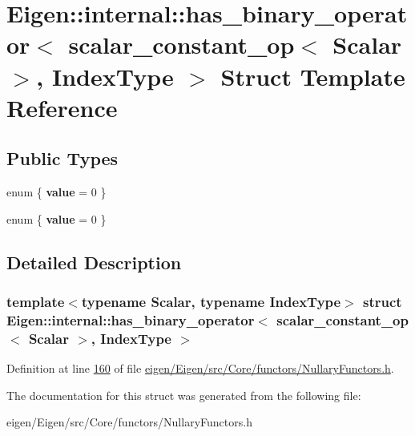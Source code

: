 \hypertarget{struct_eigen_1_1internal_1_1has__binary__operator_3_01scalar__constant__op_3_01_scalar_01_4_00_01_index_type_01_4}{}\section{Eigen\+:\+:internal\+:\+:has\+\_\+binary\+\_\+operator$<$ scalar\+\_\+constant\+\_\+op$<$ Scalar $>$, Index\+Type $>$ Struct Template Reference}
\label{struct_eigen_1_1internal_1_1has__binary__operator_3_01scalar__constant__op_3_01_scalar_01_4_00_01_index_type_01_4}
\subsection*{Public Types}
\begin{DoxyCompactItemize}
\item 
\mbox{\label{struct_eigen_1_1internal_1_1has__binary__operator_3_01scalar__constant__op_3_01_scalar_01_4_00_01_index_type_01_4_a383df48be2439042dd6eb62d88ddd324}} 
enum \{ {\bfseries value} = 0
 \}
\item 
\mbox{\label{struct_eigen_1_1internal_1_1has__binary__operator_3_01scalar__constant__op_3_01_scalar_01_4_00_01_index_type_01_4_a1d87939556b5f4c8d9a510ca7ee6189a}} 
enum \{ {\bfseries value} = 0
 \}
\end{DoxyCompactItemize}


\subsection{Detailed Description}
\subsubsection*{template$<$typename Scalar, typename Index\+Type$>$\newline
struct Eigen\+::internal\+::has\+\_\+binary\+\_\+operator$<$ scalar\+\_\+constant\+\_\+op$<$ Scalar $>$, Index\+Type $>$}



Definition at line \hyperlink{eigen_2_eigen_2src_2_core_2functors_2_nullary_functors_8h_source_l00160}{160} of file \hyperlink{eigen_2_eigen_2src_2_core_2functors_2_nullary_functors_8h_source}{eigen/\+Eigen/src/\+Core/functors/\+Nullary\+Functors.\+h}.



The documentation for this struct was generated from the following file\+:\begin{DoxyCompactItemize}
\item 
eigen/\+Eigen/src/\+Core/functors/\+Nullary\+Functors.\+h\end{DoxyCompactItemize}
